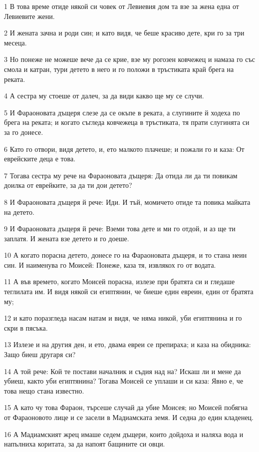 \par 1 В това време отиде някой си човек от Левиевия дом та взе за жена една от Левиевите жени.
\par 2 И жената зачна и роди син; и като видя, че беше красиво дете, кри го за три месеца.
\par 3 Но понеже не можеше вече да се крие, взе му рогозен ковчежец и намаза го със смола и катран, тури детето в него и го положи в тръстиката край брега на реката.
\par 4 А сестра му стоеше от далеч, за да види какво ще му се случи.
\par 5 И Фараоновата дъщеря слезе да се окъпе в реката, а слугините й ходеха по брега на реката; и когато съгледа ковчежеца в тръстиката, тя прати слугинята си за го донесе.
\par 6 Като го отвори, видя детето, и, ето малкото плачеше; и пожали го и каза: От еврейските деца е това.
\par 7 Тогава сестра му рече на Фараоновата дъщеря: Да отида ли да ти повикам доилка от еврейките, за да ти дои детето?
\par 8 И Фараоновата дъщеря й рече: Иди. И тъй, момичето отиде та повика майката на детето.
\par 9 И Фараоновата дъщеря й рече: Вземи това дете и ми го отдой, и аз ще ти заплатя. И жената взе детето и го доеше.
\par 10 А когато порасна детето, донесе го на Фараоновата дъщеря, и то стана неин син. И наименува го Моисей: Понеже, каза тя, извлякох го от водата.
\par 11 А във времето, когато Моисей порасна, излезе при братята си и гледаше теглилата им. И видя някой си египтянин, че биеше един евреин, един от братята му;
\par 12 и като поразгледа насам натам и видя, че няма никой, уби египтянина и го скри в пясъка.
\par 13 Излезе и на другия ден, и ето, двама евреи се препираха; и каза на обидника: Защо биеш другаря си?
\par 14 А той рече: Кой те постави началник и съдия над на? Искаш ли и мене да убиеш, както уби египтянина? Тогава Моисей се уплаши и си каза: Явно е, че това нещо стана известно.
\par 15 А като чу това Фараон, търсеше случай да убие Моисея; но Моисей побягна от Фараоновото лице и се засели в Мадиамската земя. И седна до един кладенец.
\par 16 А Мадиамският жрец имаше седем дъщери, които дойдоха и наляха вода и напълниха коритата, за да напоят бащините си овци.
